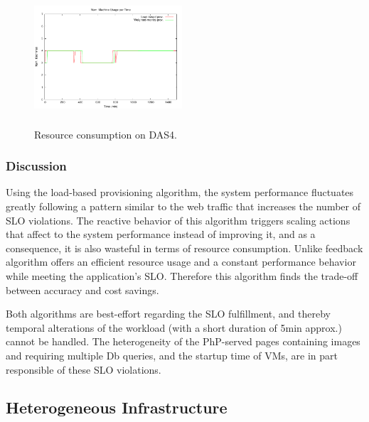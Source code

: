 \begin{figure}
\begin{center}
\includegraphics[width=0.49\textwidth, height=5cm]{./images/homogeneous/numMachinesComp}
\end{center}
\caption{Resource consumption on DAS4.}
\label{resComDas4}
\end{figure}

\subsubsection{Discussion}

Using the load-based provisioning algorithm, the system performance fluctuates greatly following a pattern similar to the web traffic that increases the number of SLO violations. The reactive behavior of this algorithm triggers scaling actions that affect to the system performance instead of improving it, and as a consequence, it is also wasteful in terms of resource consumption. Unlike feedback algorithm offers an efficient resource usage and a constant performance behavior while meeting the application's SLO. Therefore this algorithm finds the trade-off between accuracy and cost savings.

Both algorithms are best-effort regarding the SLO fulfillment, and thereby temporal alterations of the workload (with a short duration of 5min approx.) cannot be handled. The heterogeneity of the PhP-served pages containing images and requiring multiple Db queries, and the startup time of VMs, are in part responsible of these SLO violations. 




\subsection{Heterogeneous Infrastructure}

